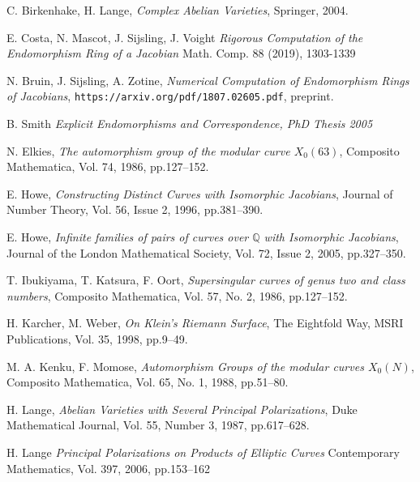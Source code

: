 \documentclass[12pt,reqno]{amsart}
\newcommand{\Q}{\mathbb{Q}}
\theoremstyle{definition}
\theoremstyle{remark}
\begin{document}
\begin{thebibliography}{20}

C. Birkenhake, H. Lange, 
\textit{Complex Abelian Varieties},
Springer, 2004.

E. Costa, N. Mascot, J. Sijsling, J. Voight
\textit{Rigorous Computation of the Endomorphism Ring of a Jacobian}
Math. Comp. 88 (2019), 1303-1339

N. Bruin, J. Sijsling, A. Zotine,
\textit{Numerical Computation of Endomorphism Rings of Jacobians},
\texttt{https://arxiv.org/pdf/1807.02605.pdf}, preprint.

B. Smith
\textit{Explicit Endomorphisms and Correspondence, PhD Thesis 2005}

N. Elkies,
\textit{The automorphism group of the modular curve $X_0(63)$},
Composito Mathematica,
Vol. 74, 1986, pp.127--152.

E. Howe,
\textit{Constructing Distinct Curves with Isomorphic Jacobians},
Journal of Number Theory,
Vol. 56, Issue 2, 1996, pp.381--390.

E. Howe,
\textit{Infinite families of pairs of curves over $\Q$ with Isomorphic Jacobians},
Journal of the London Mathematical Society,
Vol. 72, Issue 2, 2005, pp.327--350.

T. Ibukiyama, T. Katsura, F. Oort,
\textit{Supersingular curves of genus two and class numbers},
Composito Mathematica,
Vol. 57, No. 2, 1986, pp.127--152.

H. Karcher, M. Weber,
\textit{On Klein's Riemann Surface},
The Eightfold Way, MSRI Publications, 
Vol. 35, 1998, pp.9--49.

M. A. Kenku, F. Momose,
\textit{Automorphism Groups of the modular curves $X_0(N)$},
Composito Mathematica,
Vol. 65, No. 1, 1988, pp.51--80.

H. Lange,
\textit{Abelian Varieties with Several Principal Polarizations},
Duke Mathematical Journal,
Vol. 55, Number 3, 1987, pp.617--628.

H. Lange
\textit{Principal Polarizations on Products of Elliptic Curves}
Contemporary Mathematics, Vol. 397, 2006, pp.153--162


\end{thebibliography}
\end{document}
